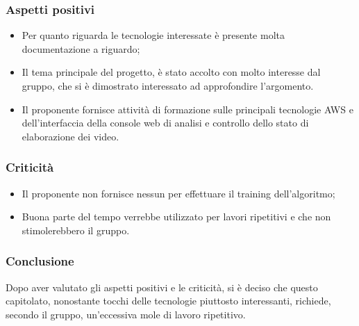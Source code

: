     \subsubsection{Aspetti positivi}
    \begin{itemize}
    		\item Per quanto riguarda le tecnologie interessate è presente molta documentazione a riguardo;	
    		\item Il tema principale del progetto, è stato accolto con molto interesse dal gruppo, che si è dimostrato interessato ad approfondire l'argomento.
    		 \item Il proponente fornisce attività di formazione sulle principali tecnologie AWS e  dell'interfaccia della console web di analisi e controllo dello stato di elaborazione dei video.
    \end{itemize}
    \subsubsection{Criticità}
    \begin{itemize}
    		\item Il proponente non fornisce nessun  per effettuare il training dell'algoritmo;
    		\item Buona parte del tempo verrebbe utilizzato per lavori ripetitivi e che non stimolerebbero il gruppo. 
    \end{itemize}
    
    \subsubsection{Conclusione}
	Dopo aver valutato gli aspetti positivi e le criticità, si è deciso che questo capitolato, nonostante tocchi delle tecnologie piuttosto interessanti, richiede, secondo il gruppo, un'eccessiva mole di lavoro ripetitivo. 